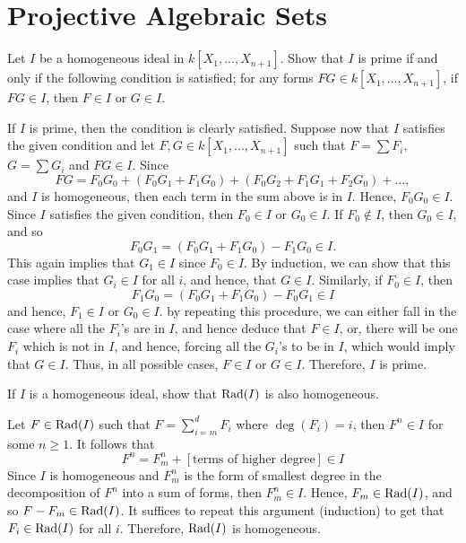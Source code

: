 \section{Projective Algebraic Sets}

\begin{exercise}
    Let $I$ be a homogeneous ideal in $k[X_1, ..., X_{n+1}]$. Show that $I$ is prime if and only if the following condition is satisfied; for any forms $FG \in k[X_1, ..., X_{n+1}]$, if $FG \in I$, then $F\in I$ or $G \in I$. \\
\end{exercise}

\begin{solution}
    If $I$ is prime, then the condition is clearly satisfied. Suppose now that $I$ satisfies the given condition and let $F,G \in k[X_1, ..., X_{n+1}]$ such that $F = \sum F_i$, $G = \sum G_i$ and $FG \in I$. Since
    $$FG = F_0G_0 + (F_0G_1 + F_1G_0) + (F_0G_2 + F_1G_1 + F_2G_0) + ...,$$
    and $I$ is homogeneous, then each term in the sum above is in $I$. Hence, $F_0G_0 \in I$. Since $I$ satisfies the given condition, then $F_0 \in I$ or $G_0 \in I$. If $F_0 \notin I$, then $G_0 \in I$, and so
    $$F_0G_1 = (F_0G_1 + F_1G_0) - F_1G_0 \in I.$$
    This again implies that $G_1 \in I$ since $F_0 \in I$. By induction, we can show that this case implies that $G_i \in I$ for all $i$, and hence, that $G \in I$. Similarly, if $F_0 \in I$, then
    $$F_1G_0 = (F_0G_1 + F_1G_0) - F_0G_1 \in I$$
    and hence, $F_1 \in I$ or $G_0 \in I$. by repeating this procedure, we can either fall in the case where all the $F_i$'s are in $I$, and hence deduce that $F \in I$, or, there will be one $F_i$ which is not in $I$, and hence, forcing all the $G_i$'s to be in $I$, which would imply that $G \in I$. Thus, in all possible cases, $F \in I$ or $G \in I$. Therefore, $I$ is prime. \\
\end{solution}

\begin{exercise}
    If $I$ is a homogeneous ideal, show that $\operatorname{Rad}(I)$ is also homogeneous. \\
\end{exercise}

\begin{solution}
    Let $F \in \operatorname{Rad}(I)$ such that $F = \sum_{i=m}^d F_i$ where $\deg(F_i) = i$, then $F^n \in I$ for some $n \geq 1$. It follows that
    $$F^n = F_m^n + [\text{terms of higher degree}] \in I$$
    Since $I$ is homogeneous and $F_m^n$ is the form of smallest degree in the decomposition of $F^n$ into a sum of forms, then $F_m^n \in I$. Hence, $F_m \in \operatorname{Rad}(I)$, and so $F - F_m \in \operatorname{Rad}(I)$. It suffices to repeat this argument (induction) to get that $F_i \in \operatorname{Rad}(I)$ for all $i$. Therefore, $\operatorname{Rad}(I)$ is homogeneous. \\
\end{solution}

